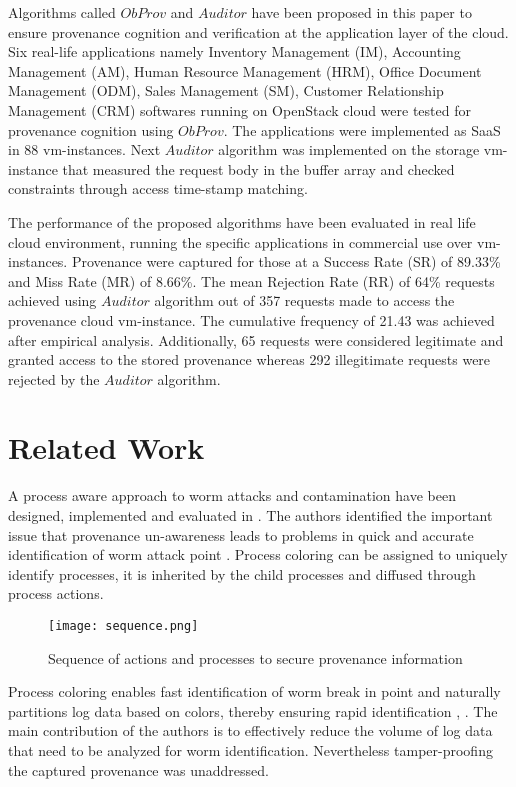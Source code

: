 \documentclass[conference]{IEEEtran}
\begin{document}
Algorithms called $ObProv$ and $Auditor$ have been proposed in this paper to ensure provenance cognition and verification at the application layer of the cloud. Six real-life applications namely Inventory Management (IM), Accounting Management (AM), Human Resource Management (HRM), Office Document Management (ODM), Sales Management (SM), Customer Relationship Management (CRM) softwares running on OpenStack cloud were tested for provenance cognition using $ObProv$. The applications were implemented as SaaS in 88 vm-instances. Next $Auditor$ algorithm was implemented on the storage vm-instance that measured the request body in the buffer array and checked constraints through access time-stamp matching.

The performance of the proposed algorithms have been evaluated in real life cloud environment, running the specific applications in commercial use over vm-instances. Provenance were captured for those at a Success Rate (SR) of 89.33\% and Miss Rate (MR) of 8.66\%. The mean Rejection Rate (RR) of 64\% requests achieved using $Auditor$ algorithm out of 357 requests made to access the provenance cloud vm-instance. The cumulative frequency of 21.43 was achieved after empirical analysis. Additionally, 65 requests were considered legitimate and granted access to the stored provenance whereas 292 illegitimate requests were rejected by the $Auditor$ algorithm.

\section{Related Work}
A process aware approach to worm attacks and contamination have been designed, implemented and evaluated in \cite{idika2013probabilistic}. The authors identified the important issue that provenance un-awareness leads to problems in quick and accurate identification of worm attack point \cite{idika2013probabilistic}. Process coloring can be assigned to uniquely identify processes, it is inherited by the child processes and diffused through process actions.

\begin{figure*}[t!]
\centering
\texttt{[image: sequence.png]}
\caption{Sequence of actions and processes to secure provenance information}
\label{figure3}
\end{figure*}

Process coloring enables fast identification of worm break in point and naturally partitions log data based on colors, thereby ensuring rapid identification \cite{marinho2012provmanager}, \cite{yu2012novel}. The main contribution of the authors is to effectively reduce the volume of log data that need to be analyzed for worm identification. Nevertheless tamper-proofing the captured provenance was unaddressed.
\end{document}
